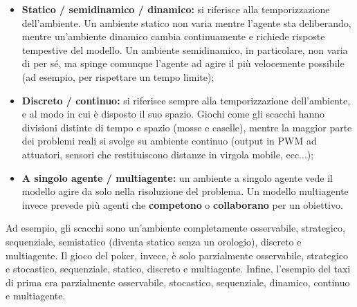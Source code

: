 \documentclass[a4paper,11pt]{article}
\begin{document}
\begin{itemize}
	\item \textbf{Statico / semidinamico / dinamico:} si riferisce alla temporizzazione dell'ambiente. Un ambiente statico non varia mentre l'agente sta deliberando, mentre un'ambiente dinamico cambia continuamente e richiede risposte tempestive del modello. Un ambiente semidinamico, in particolare, non varia di per sé, ma spinge comunque l'agente ad agire il più velocemente possibile (ad esempio, per rispettare un tempo limite);
	\item \textbf{Discreto / continuo:} si riferisce sempre alla temporizzazione dell'ambiente, e al modo in cui è disposto il suo spazio. Giochi come gli scacchi hanno divisioni distinte di tempo e spazio (mosse e caselle), mentre la maggior parte dei problemi reali si svolge su ambiente continuo (output in PWM ad attuatori, sensori che restituiscono distanze in virgola mobile, ecc...);
	\item \textbf{A singolo agente / multiagente:} un ambiente a singolo agente vede il modello agire da solo nella risoluzione del problema. Un modello multiagente invece prevede più agenti che \textbf{competono} o \textbf{collaborano} per un obiettivo. 
\end{itemize}

Ad esempio, gli scacchi sono un'ambiente completamente osservabile, strategico, sequenziale, semistatico (diventa statico senza un orologio), discreto e multiagente.
Il gioco del poker, invece, è solo parzialmente osservabile, strategico e stocastico, sequenziale, statico, discreto e multiagente.
Infine, l'esempio del taxi di prima era parzialmente osservabile, stocastico, sequenziale, dinamico, continuo e multiagente.
\end{document}
